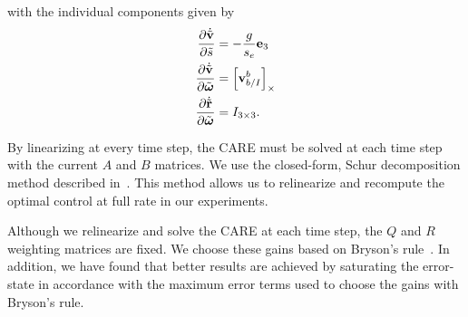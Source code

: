 with the individual components given by
\begin{align}
  \frac{\partial\dot{\tilde{\boldsymbol{\mathrm{v}}}}}{\partial\tilde{s}} & =-\frac{g}{s_e}\boldsymbol{\mathrm{e}}_{3}\\
  \frac{\partial\dot{\tilde{\boldsymbol{\mathrm{v}}}}}{\partial\tilde{\boldsymbol{\mathrm{\omega}}}} &
  =\left[ {\bf v}_{b/I}^{b} \right]_{\times} \\
  \frac{\partial\dot{\tilde{\boldsymbol{\mathrm{r}}}}}{\partial\tilde{\boldsymbol{\mathrm{\omega}}}} & =I_{3\times3}.
\end{align}

By linearizing at every time step, the CARE
must be solved at each time step with the current $A$ and $B$ matrices. We use the
closed-form, Schur decomposition method described in~\cite{laub1979schur}. This
method allows us to relinearize and recompute the optimal control at full rate
in our experiments.

Although we relinearize and solve the CARE at each time step, the $Q$ and $R$
weighting matrices are fixed. We choose these gains based on Bryson's
rule~\cite{hespanha2018linear}. In addition, we have found that better results
are achieved by saturating the error-state in accordance with the maximum error
terms used to choose the gains with Bryson's rule.
